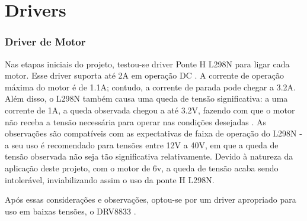 
\section{Drivers}




\subsubsection{Driver de Motor}
Nas etapas iniciais do projeto, testou-se driver Ponte H L298N para ligar cada motor. Esse driver suporta até 2A em
operação DC \cite{datasheel_l298n}. A corrente de operação máxima do motor é de 1.1A; contudo, a corrente de parada
pode chegar a 3.2A. Além disso, o L298N também causa uma queda de tensão significativa: a uma corrente de 1A, a queda
observada chegou a até 3.2V, fazendo com que o motor não receba a tensão necessária para operar nas condições
desejadas \cite{datasheel_l298n}. As observações são compatíveis com as expectativas de faixa de operação do L298N - a
seu uso é recomendado para tensões entre 12V a 40V, em que a queda de tensão observada não seja tão significativa
relativamente. Devido à natureza da aplicação deste projeto, com o motor de 6v, a queda de tensão acaba sendo
intolerável, inviabilizando assim o uso da ponte H L298N.

Após essas considerações e observações, optou-se por um driver apropriado para uso em baixas tensões, o DRV8833
\cite{datasheel_dvr8833}.